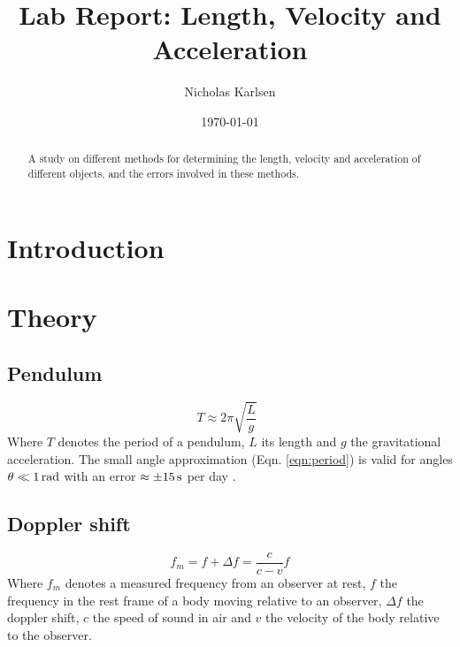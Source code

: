 \documentclass[11pt,a4paper]{article}
\begin{document}

\title{Lab Report: Length, Velocity and Acceleration}%

\author{Nicholas Karlsen}

\date{\today}%

\maketitle

\begin{abstract}
  A study on different methods for determining the length, velocity and acceleration of different objects, and the errors involved in these methods.
\end{abstract}
\section{\label{sec:intro}Introduction}

\section{\label{sec:theory}Theory}
  \subsection{Pendulum}
    \begin{equation}
      \label{eqn:period}
        T \approx 2\pi \sqrt{\frac{L}{g}}\enspace
    \end{equation}
    Where $T$ denotes the period of a pendulum, $L$ its length and $g$ the gravitational acceleration. The small angle approximation (Eqn. \ref{eqn:period})  is valid for angles $\theta \ll 1\, \textup{rad}$ with an error $\approx \pm 15 \, \textup{s}$ per day \cite{pend_wik}.

  \subsection{Doppler shift}
    \begin{equation}
      f_m = f + \Delta f = \frac{c}{c-v}f  
    \end{equation}
    Where $f_m$ denotes a measured frequency from an observer at rest, $f$ the frequency in the rest frame of a body moving relative to an observer, $\Delta f$ the doppler shift, $c$ the speed of sound in air and $v$ the velocity of the body relative to the observer.
\end{document}
